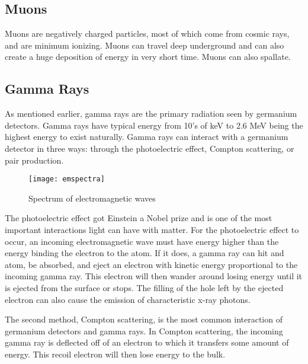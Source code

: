 \subsection{Muons}
Muons are negatively charged particles, most of which come from cosmic rays, and are minimum ionizing. 
Muons can travel deep underground and can also create a huge deposition of energy in very short time.
Muons can also spallate.

\subsection{Gamma Rays}
As mentioned earlier, gamma rays are the primary radiation seen by germanium detectors.
Gamma rays have typical energy from 10's of keV to 2.6 MeV being the highest energy to exist naturally.
Gamma rays can interact with a germanium detector in three ways: through the photoelectric effect, Compton scattering, or pair production.
\begin{figure}[htpb]
\centering
\texttt{[image: emspectra]}
\caption{Spectrum of electromagnetic waves}
\label{fig:emspectra}
\end{figure}

The photoelectric effect got Einstein a Nobel prize and is one of the most important interactions light can have with matter.
For the photoelectric effect to occur, an incoming electromagnetic wave must have energy higher than the energy binding the electron to the atom.
If it does, a gamma ray can hit and atom, be absorbed, and eject an electron with kinetic energy proportional to the incoming gamma ray.
This electron will then wander around losing energy until it is ejected from the surface or stops.
The filling of the hole left by the ejected electron can also cause the emission of characteristic x-ray photons.

The second method, Compton scattering, is the most common interaction of germanium detectors and gamma rays.
In Compton scattering, the incoming gamma ray is deflected off of an electron to which it transfers some amount of energy.
This recoil electron will then lose energy to the bulk.

